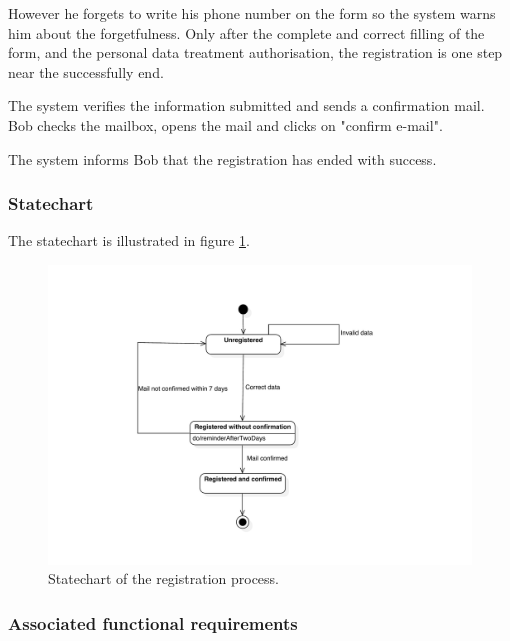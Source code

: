 However he forgets to write his phone number on the form so the system warns him about the forgetfulness.
Only after the complete and correct filling of the form, and the personal data treatment authorisation, the registration is one step near the successfully end.

The system verifies the information submitted and sends a confirmation mail.
Bob checks the mailbox, opens the mail and clicks on "confirm e-mail". 

The system informs Bob that the registration has ended with success.

\subsubsection{Statechart}
The statechart is illustrated in figure \ref{fig:statechart-registration}.
\begin{figure}
\includegraphics[width=\textwidth]{diagrams/statechart_registration.pdf}
\caption{Statechart of the registration process.}
\label{fig:statechart-registration}
\end{figure}

\subsubsection{Associated functional requirements}

